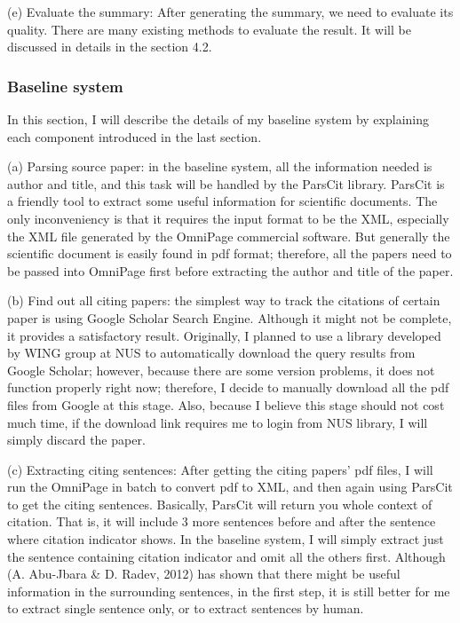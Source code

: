 \documentclass[hyp]{socreport}
\begin{document}
(e) Evaluate the summary: After generating the summary, we need to evaluate its quality. There are many existing methods 
to evaluate the result. It will be discussed in details in the section 4.2. 

\subsubsection{Baseline system}

In this section, I will describe the details of my baseline system by explaining each component introduced in the last section. 


(a) Parsing source paper: in the baseline system, all the information needed is author and title, and this task will be handled by 
the ParsCit library. ParsCit is a friendly tool to extract some useful information for scientific documents. The only inconveniency 
is that it requires the input format to be the XML, especially the XML file generated by the OmniPage commercial software. But generally 
the scientific document is easily found in pdf format; therefore, all the papers need to be passed into OmniPage first before extracting 
the author and title of the paper.

(b) Find out all citing papers: the simplest way to track the citations of certain paper is using Google Scholar Search Engine. Although 
it might not be complete, it provides a satisfactory result. Originally, I planned to use a library developed by WING group at NUS to 
automatically download the query results from Google Scholar; however, because there are some version problems, it does not function properly 
right now; therefore, I decide to manually download all the pdf files from Google at this stage. Also, because I believe this stage should not 
cost much time, if the download link requires me to login from NUS library, I will simply discard the paper.

(c) Extracting citing sentences: After getting the citing papers’ pdf files, I will run the OmniPage in batch to convert pdf to XML, and then 
again using ParsCit to get the citing sentences. Basically, ParsCit will return you whole context of citation. That is, it will include 3 more 
sentences before and after the sentence where citation indicator shows. In the baseline system, I will simply extract just the sentence containing 
citation indicator and omit all the others first. Although (A. Abu-Jbara \& D. Radev, 2012) has shown that there might be useful information in the 
surrounding sentences, in the first step, it is still better for me to extract single sentence only, or to extract sentences by human.
\end{document}
